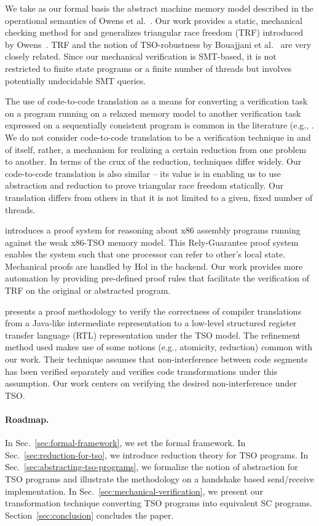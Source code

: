 \documentclass[preprint,9pt]{sigplanconf}
\begin{document}
We take as our formal basis the abstract machine memory model described in the operational semantics of Owens et al.~\cite{OSS2009}. 
Our work provides a static, mechanical checking method for and generalizes triangular race freedom (TRF) introduced by Owens~\cite{Owe2010}. 
TRF and the notion of TSO-robustness by Bouajjani et al.~\cite{BDM2013} are very closely related. 
Since our mechanical verification is SMT-based, it is not restricted to finite state programs or a finite number of threads but involves potentially undecidable SMT queries. 

The use of code-to-code translation as a means for converting a verification task on a program running on a relaxed memory model to another verification task expressed on a sequentially consistent program is common in the literature (e.g., \cite{FBP2011,BDM2013,DMV+2013,AKN+2013}. 
We do not consider code-to-code translation to be a verification technique in and of itself, rather, a mechanism for realizing a certain reduction from one problem to another. 
In terms of the crux of the reduction, techniques differ widely. 
Our code-to-code translation is also similar -- its value is in enabling us to use abstraction and reduction to prove triangular race freedom statically. 
Our translation differs from others in that it is not limited to a given, fixed number of threads. 

\cite{Rid2010} introduces a proof system for reasoning about x86 assembly programs running against the weak x86-TSO memory model. 
This Rely-Guarantee proof system enables the system such that one processor can refer to other's local state. 
Mechanical proofs are handled by Hol in the backend. Our work provides more automation by providing pre-defined proof rules that facilitate the verification of TRF on the original or abstracted program. 

\cite{JLP+2014} presents a proof methodology to verify the correctness of compiler translations from a Java-like intermediate representation to a low-level structured register transfer language (RTL) representation under the TSO model. 
The refinement method used makes use of some notions (e.g., atomicity, reduction) common with our work. 
Their technique assumes that non-interference between code segments has been verified separately and verifies code transformations under this assumption. 
Our work centers on verifying the desired non-interference under TSO. 

\paragraph{Roadmap.}
In Sec.~\ref{sec:formal-framework}, we set the formal framework.
In Sec.~\ref{sec:reduction-for-tso}, we introduce reduction theory for TSO programs.
In Sec.~\ref{sec:abstracting-tso-programs}, we formalize the notion of abstraction for TSO programs and illustrate the methodology on a handshake based send/receive implementation.
In Sec.~\ref{sec:mechanical-verification}, we present our transformation technique converting TSO programs into equivalent SC programs.
Section~\ref{sec:conclusion} concludes the paper.
\end{document}
